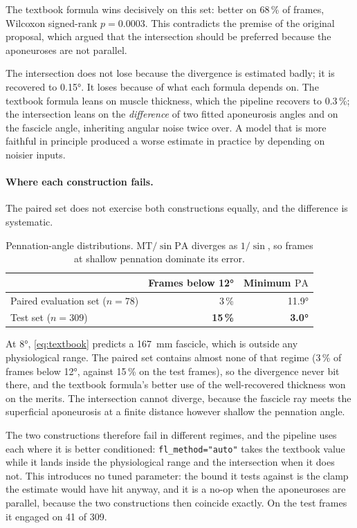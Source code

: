 \documentclass[11pt,a4paper]{article}
\newcommand{\MT}{\ensuremath{\mathrm{MT}}}
\newcommand{\PA}{\ensuremath{\mathrm{PA}}}
\begin{document}
The textbook formula wins decisively on this set: better on 68\,\% of frames,
Wilcoxon signed-rank $p=0.0003$. This contradicts the premise of the original
proposal, which argued that the intersection should be preferred because the
aponeuroses are not parallel.

The intersection does not lose because the divergence is estimated badly; it
is recovered to \ang{0.15}. It loses because of what each formula depends on. The
textbook formula leans on muscle thickness, which the pipeline recovers to
0.3\,\%; the intersection leans on the \emph{difference} of two fitted
aponeurosis angles and on the fascicle angle, inheriting angular noise twice
over. A model that is more faithful in principle produced a worse estimate in
practice by depending on noisier inputs.

\paragraph{Where each construction fails.} The paired set does not exercise both
constructions equally, and the difference is systematic.

\begin{table}[htbp]
\centering
\caption{Pennation-angle distributions. $\MT/\sin\PA$ diverges as $1/\sin$, so
frames at shallow pennation dominate its error.}
\label{tab:pa-dist}
\begin{tabular}{lrr}
\toprule
& \textbf{Frames below \ang{12}} & \textbf{Minimum \PA} \\
\midrule
Paired evaluation set ($n=78$) & 3\,\% & \ang{11.9} \\
Test set ($n=309$) & \textbf{15\,\%} & \textbf{\ang{3.0}} \\
\bottomrule
\end{tabular}
\end{table}

At \ang{8}, \eqref{eq:textbook} predicts a \SI{167}{\milli\metre} fascicle, which
is outside any physiological range. The paired set contains almost none of that
regime (3\,\% of frames below \ang{12}, against 15\,\% on the test frames),
so the divergence never bit there, and the textbook formula's better use of the
well-recovered thickness won on the merits. The intersection cannot diverge,
because the fascicle ray meets the superficial aponeurosis at a finite distance
however shallow the pennation angle.

The two constructions therefore fail in different regimes, and the pipeline uses
each where it is better conditioned: \texttt{fl\_method="auto"} takes the
textbook value while it lands inside the physiological range and the intersection
when it does not. This introduces no tuned parameter: the bound it tests
against is the clamp the estimate would have hit anyway, and it is a no-op
when the aponeuroses are parallel, because the two constructions then coincide
exactly. On the test frames it engaged on 41 of 309.
\end{document}
